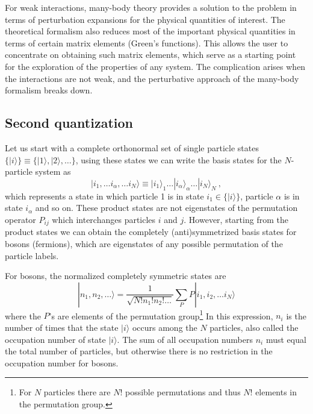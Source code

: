 For weak interactions, many-body theory provides a solution to the problem in
terms of perturbation expansions for the physical quantities of interest.   The
theoretical formalism also reduces most of the important physical quantities in
terms of certain matrix elements (Green's functions). This allows the user to
concentrate on obtaining such matrix elements, which serve as a starting point
for the exploration of the properties of any system.   The complication arises
when the interactions are not weak, and the perturbative approach of the
many-body formalism breaks down.   


\subsection{Second quantization}


Let us start with a complete orthonormal set of single particle states $\lbrace
|i\rangle \rbrace \equiv \lbrace |1\rangle, |2\rangle, \ldots \rbrace$, using
these states we can write the basis states for the $N$-particle system as
\begin{equation}
   | i_{1}, \ldots i_{\alpha}, \ldots i_{N} \rangle \equiv 
   | i_{1}\rangle_{1} \ldots |i_{\alpha}\rangle_{\alpha} \ldots 
   | i_{N} \rangle_{N} ~,
\end{equation} 
which represents a state in which particle 1 is in state $i_{1} \in \lbrace
|i\rangle \rbrace$, particle $\alpha$ is in state $i_{\alpha}$ and so on.
These product states are not eigenstates of the permutation operator $P_{ij}$
which interchanges particles $i$ and $j$.  However, starting from the product
states we can obtain the completely (anti)symmetrized basis states for bosons
(fermions), which are eigenstates of any possible permutation of the
particle labels.  

For bosons, the normalized completely symmetric states are
\begin{equation} 
  | n_{1},  n_{2}, \ldots \rangle = 
  \frac{1}{\sqrt{N!n_{1}!n_{2}!\ldots}} \sum_{P}  
    P | i_{1},  i_{2}, \ldots i_{N} \rangle
\end{equation} 
where the $P$'s are elements of the permutation group\footnote{For $N$
particles there are $N!$ possible permutations and thus $N!$ elements in the
permutation group.}  In this expression, $n_{i}$ is the number of times that
the state $|i\rangle$ occurs among the $N$ particles, also called the
occupation number of state $|i\rangle$.  The sum of all occupation numbers
$n_{i}$ must equal the total number of particles, but otherwise there is no
restriction in the occupation number for bosons.

